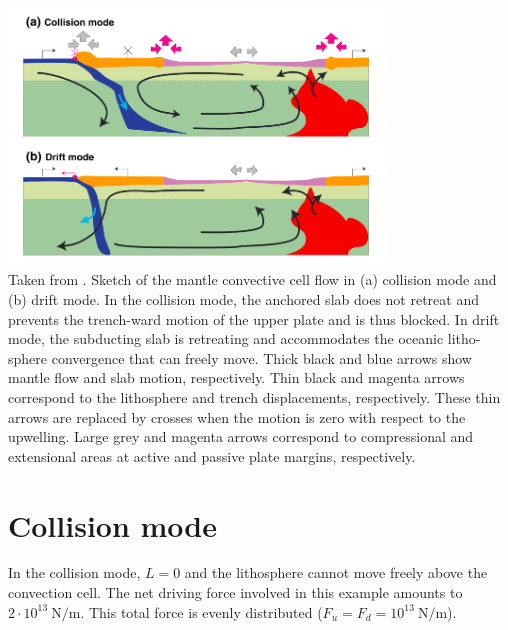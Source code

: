 \begin{center}
\includegraphics[width=10cm]{python_codes/fieldstone_143/images/yahb13_b}\\
{\captionfont 
Taken from \cite{yahb13}. 
Sketch of the mantle convective cell flow in (a) collision mode and (b) drift mode. In the
collision mode, the anchored slab does not retreat and prevents the trench-ward motion of the upper plate
and is thus blocked. In drift mode, the subducting slab is retreating and accommodates the oceanic litho-
sphere convergence that can freely move. Thick black and blue arrows show mantle flow and slab motion,
respectively. Thin black and magenta arrows correspond to the lithosphere and trench displacements,
respectively. These thin arrows are replaced by crosses when the motion is zero with respect to the upwelling.
Large grey and magenta arrows correspond to compressional and extensional areas at active and passive plate
margins, respectively.
}
\end{center}


\section*{Collision mode}

In the collision mode, $L = 0$ and the lithosphere cannot
move freely above the convection cell. The net driving force involved in this
example amounts to $2\cdot 10^{13}~\si{\newton\per\meter}$. This total force is evenly
distributed ($F_u = F_d = 10^{13}~\si{\newton\per\meter}$). 




